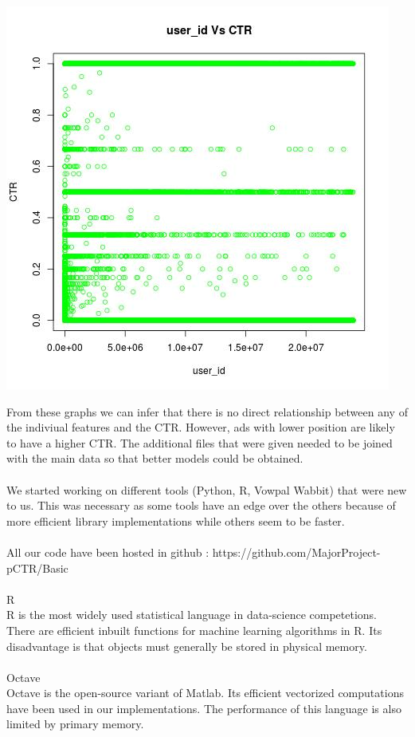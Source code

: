 \documentclass[10pt]{article}
\begin{document}
\includegraphics[scale=0.5]{user_id_Vs_CTR}

From these graphs we can infer that there is no direct relationship between any of the indiviual features and the CTR. However, ads with lower position are likely to have a higher CTR.
The additional files that were given needed to be joined with the main data so that better models could be obtained. \\\\

We started working on different tools (Python, R, Vowpal Wabbit) that were new to us. This was necessary as some tools have an edge over the others because of more efficient library implementations while others seem to be faster. \\\\
All our code have been hosted in github : https://github.com/MajorProject-pCTR/Basic \\\\
R \\
R is the most widely used statistical language in data-science competetions. There are efficient inbuilt functions for machine learning algorithms in R. Its disadvantage is that objects must generally be stored in physical memory. \\\\
Octave \\
Octave is the open-source variant of Matlab. Its efficient vectorized computations have been used in our implementations. The performance of this language is also limited by primary memory.\\\\
\end{document}
